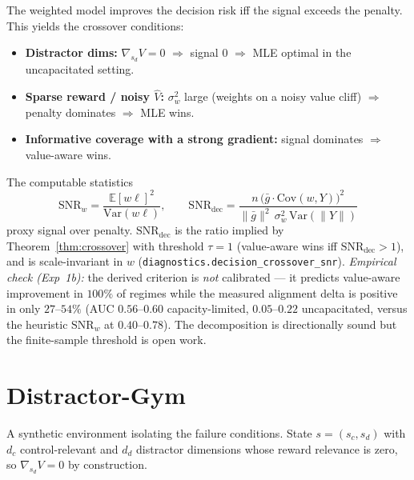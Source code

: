 \documentclass{article}
\theoremstyle{plain}
\begin{document}
The weighted model improves the decision risk iff the signal exceeds the penalty. This
yields the crossover conditions:
\begin{itemize}
\item \textbf{Distractor dims:} $\nabla_{s_d} V = 0$ $\Rightarrow$ signal $0$
  $\Rightarrow$ MLE optimal in the uncapacitated setting.
\item \textbf{Sparse reward / noisy $\hat{V}$:} $\sigma_w^2$ large (weights on a noisy
  value cliff) $\Rightarrow$ penalty dominates $\Rightarrow$ MLE wins.
\item \textbf{Informative coverage with a strong gradient:} signal dominates
  $\Rightarrow$ value-aware wins.
\end{itemize}

The computable statistics
\begin{equation}
  \mathrm{SNR}_w = \frac{\mathbb{E}[w\ell]^2}{\mathrm{Var}(w\ell)},
  \qquad
  \mathrm{SNR}_{\mathrm{dec}} = \frac{n\,\bigl(\bar g \cdot \mathrm{Cov}(w, Y)\bigr)^2}
    {\lVert \bar g\rVert^2\, \sigma_w^2\, \mathrm{Var}(\lVert Y\rVert)}
\end{equation}
proxy signal over penalty. $\mathrm{SNR}_{\mathrm{dec}}$ is the ratio implied by
Theorem~\ref{thm:crossover} with threshold $\tau = 1$ (value-aware wins iff
$\mathrm{SNR}_{\mathrm{dec}} > 1$), and is scale-invariant in $w$
(\texttt{diagnostics.decision\_crossover\_snr}). \emph{Empirical check (Exp~1b):} the
derived criterion is \emph{not} calibrated --- it predicts value-aware improvement in
$100\%$ of regimes while the measured alignment delta is positive in only $27$--$54\%$
(AUC $0.56$--$0.60$ capacity-limited, $0.05$--$0.22$ uncapacitated, versus the heuristic
$\mathrm{SNR}_w$ at $0.40$--$0.78$). The decomposition is directionally sound but the
finite-sample threshold is open work.

\section{Distractor-Gym}

A synthetic environment isolating the failure conditions. State $s = (s_c, s_d)$ with
$d_c$ control-relevant and $d_d$ distractor dimensions whose reward relevance is zero,
so $\nabla_{s_d} V = 0$ by construction.
\end{document}
